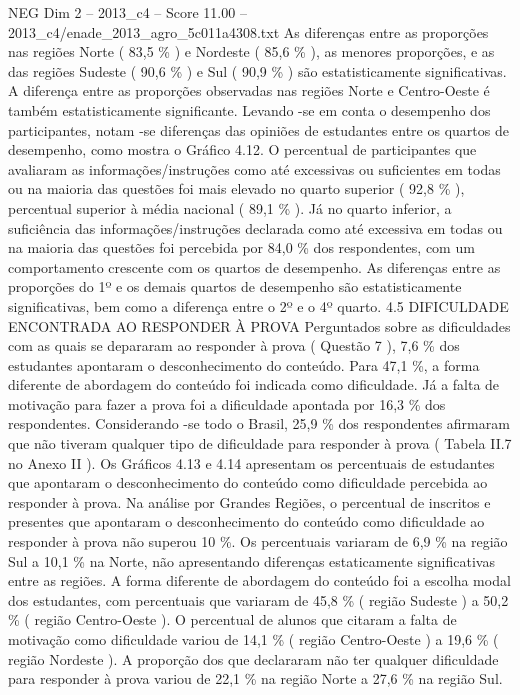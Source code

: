 \begin{textsample}{NEG Dim 2 – 2013\_c4 – Score 11.00 – 2013\_c4/enade\_2013\_agro\_5c011a4308.txt}
As diferenças entre as proporções nas regiões Norte ( 83,5 \% ) e Nordeste ( 85,6 \% ), as menores proporções, e as das regiões Sudeste ( 90,6 \% ) e Sul ( 90,9 \% ) são estatisticamente significativas.
A diferença entre as proporções observadas nas regiões Norte e Centro-Oeste é também estatisticamente significante.
Levando -se em conta o desempenho dos participantes, notam -se diferenças das opiniões de estudantes entre os quartos de desempenho, como mostra o Gráfico 4.12.
O percentual de participantes que avaliaram as informações/instruções como até excessivas ou suficientes em todas ou na maioria das questões foi mais elevado no quarto superior ( 92,8 \% ), percentual superior à média nacional ( 89,1 \% ).
Já no quarto inferior, a suficiência das informações/instruções declarada como até excessiva em todas ou na maioria das questões foi percebida por 84,0 \% dos respondentes, com um comportamento crescente com os quartos de desempenho.
As diferenças entre as proporções do 1º e os demais quartos de desempenho são estatisticamente significativas, bem como a diferença entre o 2º e o 4º quarto. 4.5 DIFICULDADE ENCONTRADA AO RESPONDER À PROVA Perguntados sobre as dificuldades com as quais se depararam ao responder à prova ( Questão 7 ), 7,6 \% dos estudantes apontaram o desconhecimento do conteúdo.
Para 47,1 \%, a forma diferente de abordagem do conteúdo foi indicada como dificuldade.
Já a falta de motivação para fazer a prova foi a dificuldade apontada por 16,3 \% dos respondentes.
Considerando -se todo o Brasil, 25,9 \% dos respondentes afirmaram que não tiveram qualquer tipo de dificuldade para responder à prova ( Tabela II.7 no Anexo II ).
Os Gráficos 4.13 e 4.14 apresentam os percentuais de estudantes que apontaram o desconhecimento do conteúdo como dificuldade percebida ao responder à prova.
Na análise por Grandes Regiões, o percentual de inscritos e presentes que apontaram o desconhecimento do conteúdo como dificuldade ao responder à prova não superou 10 \%.
Os percentuais variaram de 6,9 \% na região Sul a 10,1 \% na Norte, não apresentando diferenças estaticamente significativas entre as regiões.
A forma diferente de abordagem do conteúdo foi a escolha modal dos estudantes, com percentuais que variaram de 45,8 \% ( região Sudeste ) a 50,2 \% ( região Centro-Oeste ).
O percentual de alunos que citaram a falta de motivação como dificuldade variou de 14,1 \% ( região Centro-Oeste ) a 19,6 \% ( região Nordeste ).
A proporção dos que declararam não ter qualquer dificuldade para responder à prova variou de 22,1 \% na região Norte a 27,6 \% na região Sul.

\end{textsample}
